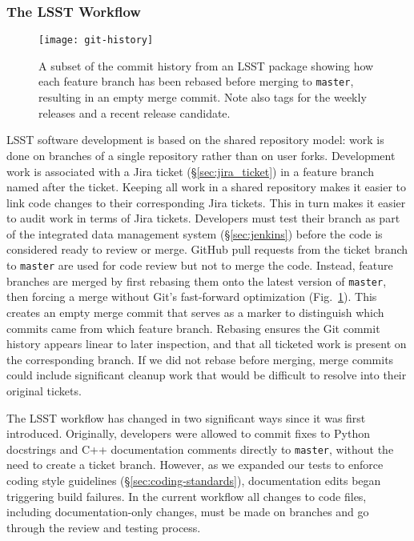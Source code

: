 \subsubsection{The LSST Workflow}\label{sec:dev_workflow}

\begin{figure}[t]
\begin{center}
  \texttt{[image: git-history]}
\end{center}
\caption{A subset of the commit history from an  LSST package showing how each feature branch has been rebased before merging to \texttt{master}, resulting in an empty merge commit.
Note also  tags for the weekly releases and a recent release candidate.
\label{fig:commitlog}
}
\end{figure}

LSST software development is based on the shared repository model: work is done on branches of a single repository rather than on user forks.
Development work is associated with a Jira ticket (\S\ref{sec:jira_ticket}) in a feature branch named after the ticket.
Keeping all work in a shared repository makes it easier to link code changes to their corresponding Jira tickets.
This in turn makes it easier to audit work in terms of Jira tickets.
Developers must test their branch as part of the integrated data management system (\S\ref{sec:jenkins}) before the code is considered ready to review or merge.
GitHub pull requests from the ticket branch to \texttt{master} are used for code review but not to merge the code.
Instead, feature branches are merged by first rebasing them onto the latest version of \texttt{master}, then forcing a merge without Git's fast-forward optimization (Fig.~\ref{fig:commitlog}).
This creates an empty merge commit that serves as a marker to distinguish which commits came from which feature branch.
Rebasing ensures the Git commit history appears linear to later inspection, and that all ticketed work is present on the corresponding branch.
If we did not rebase before merging, merge commits could include significant cleanup work that would be difficult to resolve into their original tickets.

The LSST workflow has changed in two significant ways since it was first introduced.
Originally, developers were allowed to commit fixes to Python docstrings and C++ documentation comments directly to \texttt{master}, without the need to create a ticket branch.
However, as we expanded our tests to enforce coding style guidelines (\S\ref{sec:coding-standards}), documentation edits began triggering build failures.
In the current workflow all changes to code files, including documentation-only changes, must be made on branches and go through the review and testing process.

